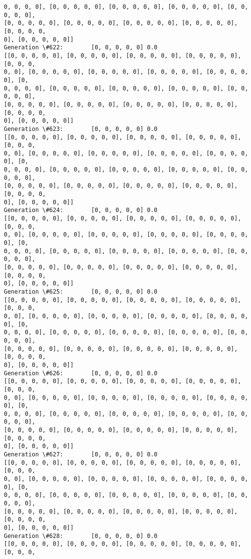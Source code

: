\documentclass[11pt]{article}
\begin{document}
\begin{Verbatim}[commandchars=\\\{\}]
0, 0, 0, 0], [0, 0, 0, 0, 0], [0, 0, 0, 0, 0], [0, 0, 0, 0, 0], [0, 0, 0, 0, 0],
[0, 0, 0, 0, 0], [0, 0, 0, 0, 0], [0, 0, 0, 0, 0], [0, 0, 0, 0, 0], [0, 0, 0, 0,
0], [0, 0, 0, 0, 0]]
Generation \#622:        [0, 0, 0, 0, 0] 0.0
[[0, 0, 0, 0, 0], [0, 0, 0, 0, 0], [0, 0, 0, 0, 0], [0, 0, 0, 0, 0], [0, 0, 0,
0, 0], [0, 0, 0, 0, 0], [0, 0, 0, 0, 0], [0, 0, 0, 0, 0], [0, 0, 0, 0, 0], [0,
0, 0, 0, 0], [0, 0, 0, 0, 0], [0, 0, 0, 0, 0], [0, 0, 0, 0, 0], [0, 0, 0, 0, 0],
[0, 0, 0, 0, 0], [0, 0, 0, 0, 0], [0, 0, 0, 0, 0], [0, 0, 0, 0, 0], [0, 0, 0, 0,
0], [0, 0, 0, 0, 0]]
Generation \#623:        [0, 0, 0, 0, 0] 0.0
[[0, 0, 0, 0, 0], [0, 0, 0, 0, 0], [0, 0, 0, 0, 0], [0, 0, 0, 0, 0], [0, 0, 0,
0, 0], [0, 0, 0, 0, 0], [0, 0, 0, 0, 0], [0, 0, 0, 0, 0], [0, 0, 0, 0, 0], [0,
0, 0, 0, 0], [0, 0, 0, 0, 0], [0, 0, 0, 0, 0], [0, 0, 0, 0, 0], [0, 0, 0, 0, 0],
[0, 0, 0, 0, 0], [0, 0, 0, 0, 0], [0, 0, 0, 0, 0], [0, 0, 0, 0, 0], [0, 0, 0, 0,
0], [0, 0, 0, 0, 0]]
Generation \#624:        [0, 0, 0, 0, 0] 0.0
[[0, 0, 0, 0, 0], [0, 0, 0, 0, 0], [0, 0, 0, 0, 0], [0, 0, 0, 0, 0], [0, 0, 0,
0, 0], [0, 0, 0, 0, 0], [0, 0, 0, 0, 0], [0, 0, 0, 0, 0], [0, 0, 0, 0, 0], [0,
0, 0, 0, 0], [0, 0, 0, 0, 0], [0, 0, 0, 0, 0], [0, 0, 0, 0, 0], [0, 0, 0, 0, 0],
[0, 0, 0, 0, 0], [0, 0, 0, 0, 0], [0, 0, 0, 0, 0], [0, 0, 0, 0, 0], [0, 0, 0, 0,
0], [0, 0, 0, 0, 0]]
Generation \#625:        [0, 0, 0, 0, 0] 0.0
[[0, 0, 0, 0, 0], [0, 0, 0, 0, 0], [0, 0, 0, 0, 0], [0, 0, 0, 0, 0], [0, 0, 0,
0, 0], [0, 0, 0, 0, 0], [0, 0, 0, 0, 0], [0, 0, 0, 0, 0], [0, 0, 0, 0, 0], [0,
0, 0, 0, 0], [0, 0, 0, 0, 0], [0, 0, 0, 0, 0], [0, 0, 0, 0, 0], [0, 0, 0, 0, 0],
[0, 0, 0, 0, 0], [0, 0, 0, 0, 0], [0, 0, 0, 0, 0], [0, 0, 0, 0, 0], [0, 0, 0, 0,
0], [0, 0, 0, 0, 0]]
Generation \#626:        [0, 0, 0, 0, 0] 0.0
[[0, 0, 0, 0, 0], [0, 0, 0, 0, 0], [0, 0, 0, 0, 0], [0, 0, 0, 0, 0], [0, 0, 0,
0, 0], [0, 0, 0, 0, 0], [0, 0, 0, 0, 0], [0, 0, 0, 0, 0], [0, 0, 0, 0, 0], [0,
0, 0, 0, 0], [0, 0, 0, 0, 0], [0, 0, 0, 0, 0], [0, 0, 0, 0, 0], [0, 0, 0, 0, 0],
[0, 0, 0, 0, 0], [0, 0, 0, 0, 0], [0, 0, 0, 0, 0], [0, 0, 0, 0, 0], [0, 0, 0, 0,
0], [0, 0, 0, 0, 0]]
Generation \#627:        [0, 0, 0, 0, 0] 0.0
[[0, 0, 0, 0, 0], [0, 0, 0, 0, 0], [0, 0, 0, 0, 0], [0, 0, 0, 0, 0], [0, 0, 0,
0, 0], [0, 0, 0, 0, 0], [0, 0, 0, 0, 0], [0, 0, 0, 0, 0], [0, 0, 0, 0, 0], [0,
0, 0, 0, 0], [0, 0, 0, 0, 0], [0, 0, 0, 0, 0], [0, 0, 0, 0, 0], [0, 0, 0, 0, 0],
[0, 0, 0, 0, 0], [0, 0, 0, 0, 0], [0, 0, 0, 0, 0], [0, 0, 0, 0, 0], [0, 0, 0, 0,
0], [0, 0, 0, 0, 0]]
Generation \#628:        [0, 0, 0, 0, 0] 0.0
[[0, 0, 0, 0, 0], [0, 0, 0, 0, 0], [0, 0, 0, 0, 0], [0, 0, 0, 0, 0], [0, 0, 0,

\end{Verbatim}
\end{document}
